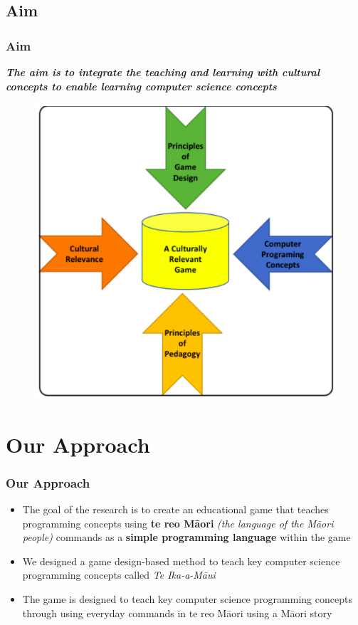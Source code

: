 \documentclass[aspectratio=169]{beamer}
\begin{document}
\subsection{Aim}
\begin{frame}
\frametitle{Aim}
\textit{\textbf{The aim is to integrate the teaching and learning with cultural concepts to enable learning computer science concepts}} 
\begin{figure}
\includegraphics[scale=0.24]{p1.png}
\end{figure}
\end{frame}

\section{Our Approach}
\begin{frame}
\frametitle{Our Approach}
\begin{itemize}
\item The goal of the research is to create an educational game that teaches programming concepts using \textbf{te reo M\=aori} \textit{(the language of the M\=aori people)} commands  as a \textbf{simple programming language} within the game
\newline
\item We designed a game design-based method to teach key computer science programming concepts called \textit{Te Ika-a-Māui}
\newline	
\item The game is designed to teach key computer science programming concepts through using everyday commands in te reo M\=aori using a M\=aori story 
\end{itemize}
\end{frame}
\end{document}
